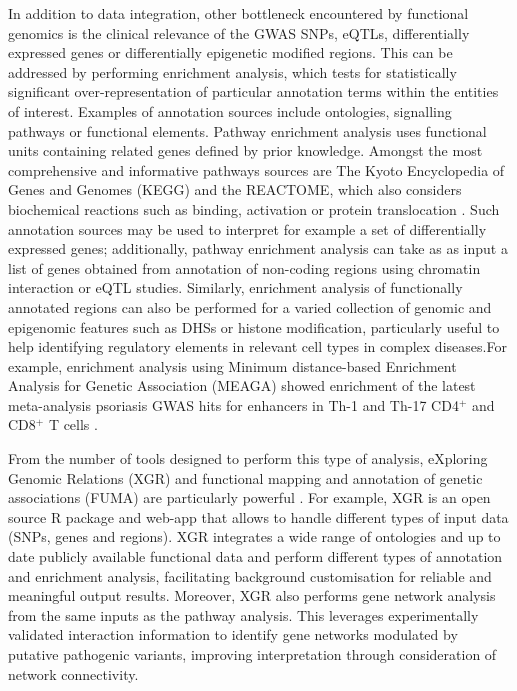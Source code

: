 In addition to data integration, other bottleneck encountered by functional genomics is the clinical relevance of the GWAS SNPs, eQTLs, differentially expressed genes or differentially epigenetic modified regions. This can be addressed by performing enrichment analysis, which tests for statistically significant over-representation of particular annotation terms within the entities of interest. Examples of annotation sources include ontologies, signalling pathways or functional elements. Pathway enrichment analysis uses functional units containing related genes defined by prior knowledge. Amongst the most comprehensive and informative pathways sources are The Kyoto Encyclopedia of Genes and Genomes (KEGG) and the REACTOME, which also considers biochemical reactions such as binding, activation or protein translocation \parencite{Kanehisa2000}. Such annotation sources may be used to interpret for example a set of differentially expressed genes; additionally, pathway enrichment analysis can take as as input a list of genes obtained from annotation of non-coding regions using chromatin interaction or eQTL studies. Similarly, enrichment analysis of functionally annotated regions can also be performed for a varied collection of genomic and epigenomic features such as DHSs or histone modification, particularly useful to help identifying regulatory elements in relevant cell types in complex diseases.For example, enrichment analysis using Minimum distance-based Enrichment Analysis for Genetic Association (MEAGA) showed enrichment of the latest meta-analysis psoriasis GWAS hits for enhancers in Th-1 and Th-17 CD4$^+$ and CD8$^+$ T cells \parencite{Tsoi2017}.

From the number of tools designed to perform this type of analysis, eXploring Genomic Relations (XGR) and functional mapping and annotation of genetic associations (FUMA) are particularly powerful \parencite{Fang2016,Watanabe2017}. For example, XGR is an open source R package and web-app that allows to handle different types of input data (SNPs, genes and regions). XGR integrates a wide range of ontologies and up to date publicly available functional data and perform different types of annotation and enrichment analysis, facilitating background customisation for reliable and meaningful output results. Moreover, XGR also performs gene network analysis from the same inputs as the pathway analysis. This leverages experimentally validated interaction information to identify gene networks modulated by putative pathogenic variants, improving interpretation through consideration of network connectivity.


